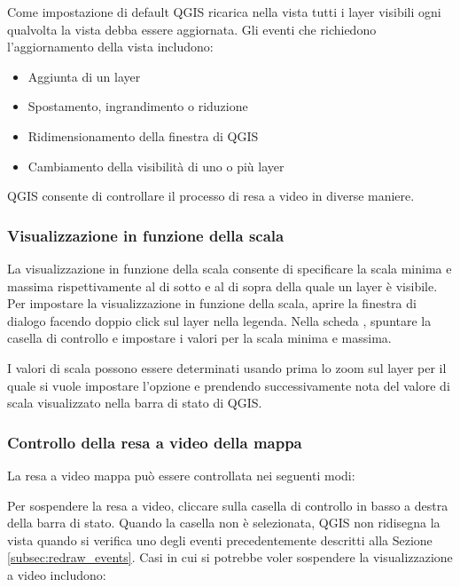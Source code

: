 Come impostazione di default QGIS ricarica nella vista tutti i layer visibili
ogni qualvolta la vista debba essere aggiornata. Gli eventi che richiedono
l'aggiornamento della vista includono:

\begin{itemize}
\item Aggiunta di un layer
\item Spostamento, ingrandimento o riduzione
\item Ridimensionamento della finestra di QGIS
\item Cambiamento della visibilità di uno o più layer
\end{itemize}

QGIS consente di controllare il processo di resa a video in diverse maniere.

\subsubsection{Visualizzazione in funzione della scala}
\label{label_scaledepend}

La visualizzazione in funzione della scala consente di specificare la scala
minima e massima rispettivamente al di sotto e al di sopra della quale un
layer è visibile. Per impostare la visualizzazione in funzione della scala,
aprire la finestra di dialogo  facendo doppio click sul
layer nella legenda. Nella scheda , spuntare la casella di
controllo  e impostare i valori per la scala minima e massima.

I valori di scala possono essere determinati usando prima lo zoom sul layer per
il quale si vuole impostare l'opzione e prendendo successivamente nota del valore di scala
visualizzato nella barra di stato di QGIS.

\subsubsection{Controllo della resa a video della mappa}\label{label_controlmap}

La resa a video mappa può essere controllata nei seguenti modi:

\label{label_suspendrender}

Per sospendere la resa a video, cliccare sulla casella di controllo
 in basso a destra della barra di stato. Quando la casella
 non è selezionata, QGIS non ridisegna la vista quando si
verifica uno degli eventi precedentemente descritti alla Sezione
\ref{subsec:redraw_events}. Casi in cui si potrebbe voler sospendere la
visualizzazione a video includono:

